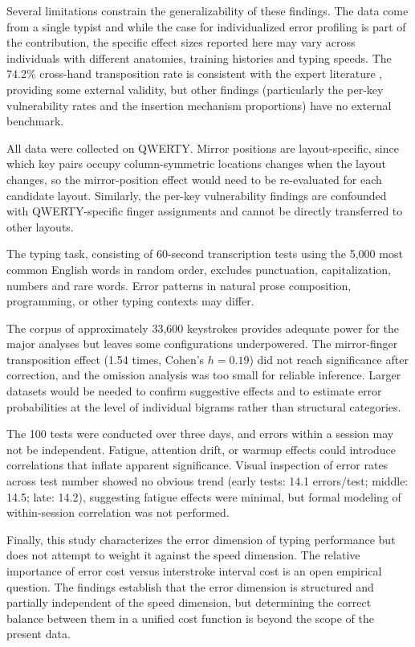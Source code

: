\documentclass[12pt]{article}
\begin{document}
Several limitations constrain the generalizability of these findings. The data come from a single typist and while the case for individualized error profiling is part of the contribution, the specific effect sizes reported here may vary across individuals with different anatomies, training histories and typing speeds. The 74.2\% cross-hand transposition rate is consistent with the expert literature \citep{grudin1983}, providing some external validity, but other findings (particularly the per-key vulnerability rates and the insertion mechanism proportions) have no external benchmark.

All data were collected on QWERTY. Mirror positions are layout-specific, since which key pairs occupy column-symmetric locations changes when the layout changes, so the mirror-position effect would need to be re-evaluated for each candidate layout. Similarly, the per-key vulnerability findings are confounded with QWERTY-specific finger assignments and cannot be directly transferred to other layouts.

The typing task, consisting of 60-second transcription tests using the 5,000 most common English words in random order, excludes punctuation, capitalization, numbers and rare words. Error patterns in natural prose composition, programming, or other typing contexts may differ.

The corpus of approximately 33,600 keystrokes provides adequate power for the major analyses but leaves some configurations underpowered. The mirror-finger transposition effect (1.54 times, Cohen's $h = 0.19$) did not reach significance after correction, and the omission analysis was too small for reliable inference. Larger datasets would be needed to confirm suggestive effects and to estimate error probabilities at the level of individual bigrams rather than structural categories.

The 100 tests were conducted over three days, and errors within a session may not be independent. Fatigue, attention drift, or warmup effects could introduce correlations that inflate apparent significance. Visual inspection of error rates across test number showed no obvious trend (early tests: 14.1 errors/test; middle: 14.5; late: 14.2), suggesting fatigue effects were minimal, but formal modeling of within-session correlation was not performed.

Finally, this study characterizes the error dimension of typing performance but does not attempt to weight it against the speed dimension. The relative importance of error cost versus interstroke interval cost is an open empirical question. The findings establish that the error dimension is structured and partially independent of the speed dimension, but determining the correct balance between them in a unified cost function is beyond the scope of the present data.
\end{document}
